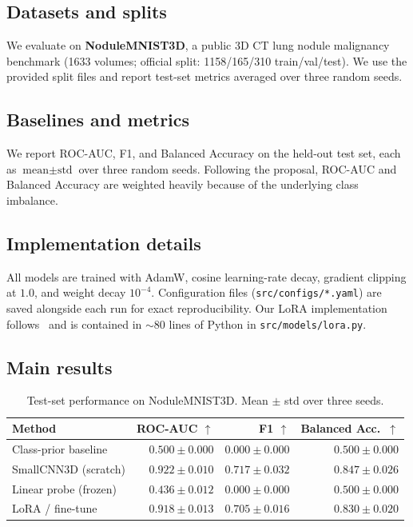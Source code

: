 \documentclass{article}
\begin{document}
\subsection{Datasets and splits}

We evaluate on \textbf{NoduleMNIST3D}, a public 3D CT lung nodule
malignancy benchmark (1633 volumes; official split: 1158/165/310
train/val/test). We use the provided split files and report test-set
metrics averaged over three random seeds.

\subsection{Baselines and metrics}

We report ROC-AUC, F1, and Balanced Accuracy on the held-out test
set, each as $\text{mean} \pm \text{std}$ over three random seeds.
Following the proposal, ROC-AUC and Balanced Accuracy are weighted
heavily because of the underlying class imbalance.

\subsection{Implementation details}

All models are trained with AdamW, cosine learning-rate decay, gradient
clipping at $1.0$, and weight decay $10^{-4}$. Configuration files
(\texttt{src/configs/*.yaml}) are saved alongside each run for exact
reproducibility. Our LoRA implementation follows~\citet{hu2022_lora}
and is contained in $\sim$80 lines of Python in \texttt{src/models/lora.py}.

\subsection{Main results}

\begin{table}[t]
  \caption{Test-set performance on NoduleMNIST3D. Mean $\pm$ std over
    three seeds.}
  \label{tab:main}
  \centering
  \small
  \begin{tabular}{l r r r}
    \toprule
    Method & ROC-AUC $\uparrow$ & F1 $\uparrow$ & Balanced Acc.\ $\uparrow$ \\
    \midrule
    Class-prior baseline & $0.500 \pm 0.000$ & $0.000 \pm 0.000$ & $0.500 \pm 0.000$ \\
    SmallCNN3D (scratch) & $0.922 \pm 0.010$ & $0.717 \pm 0.032$ & $0.847 \pm 0.026$ \\
    Linear probe (frozen) & $0.436 \pm 0.012$ & $0.000 \pm 0.000$ & $0.500 \pm 0.000$ \\
    LoRA / fine-tune & $0.918 \pm 0.013$ & $0.705 \pm 0.016$ & $0.830 \pm 0.020$ \\
    \bottomrule
  \end{tabular}
\end{table}
\end{document}
